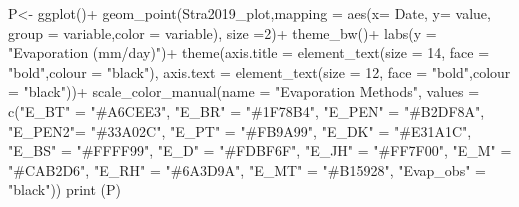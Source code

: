\documentclass[
]{article}
\newenvironment{Shaded}{\begin{snugshade}}{\end{snugshade}}
\newcommand{\AttributeTok}[1]{\textcolor[rgb]{0.77,0.63,0.00}{#1}}
\newcommand{\DecValTok}[1]{\textcolor[rgb]{0.00,0.00,0.81}{#1}}
\newcommand{\FunctionTok}[1]{\textcolor[rgb]{0.00,0.00,0.00}{#1}}
\newcommand{\NormalTok}[1]{#1}
\newcommand{\OtherTok}[1]{\textcolor[rgb]{0.56,0.35,0.01}{#1}}
\newcommand{\SpecialCharTok}[1]{\textcolor[rgb]{0.00,0.00,0.00}{#1}}
\newcommand{\StringTok}[1]{\textcolor[rgb]{0.31,0.60,0.02}{#1}}
\begin{document}
\begin{Shaded}
\begin{Highlighting}[]
\NormalTok{P}\OtherTok{\textless{}{-}} \FunctionTok{ggplot}\NormalTok{()}\SpecialCharTok{+}
  \FunctionTok{geom\_point}\NormalTok{(Stra2019\_plot,}\AttributeTok{mapping =} \FunctionTok{aes}\NormalTok{(}\AttributeTok{x=}\NormalTok{ Date, }\AttributeTok{y=}\NormalTok{ value,  }\AttributeTok{group =}\NormalTok{ variable,}\AttributeTok{color =}\NormalTok{ variable), }\AttributeTok{size =}\DecValTok{2}\NormalTok{)}\SpecialCharTok{+}
  \FunctionTok{theme\_bw}\NormalTok{()}\SpecialCharTok{+}
  \FunctionTok{labs}\NormalTok{(}\AttributeTok{y =} \StringTok{"Evaporation (mm/day)"}\NormalTok{)}\SpecialCharTok{+}
  \FunctionTok{theme}\NormalTok{(}\AttributeTok{axis.title =} \FunctionTok{element\_text}\NormalTok{(}\AttributeTok{size =} \DecValTok{14}\NormalTok{, }\AttributeTok{face =} \StringTok{"bold"}\NormalTok{,}\AttributeTok{colour =} \StringTok{"black"}\NormalTok{),}
        \AttributeTok{axis.text  =} \FunctionTok{element\_text}\NormalTok{(}\AttributeTok{size =} \DecValTok{12}\NormalTok{, }\AttributeTok{face =} \StringTok{"bold"}\NormalTok{,}\AttributeTok{colour =} \StringTok{"black"}\NormalTok{))}\SpecialCharTok{+}
  \FunctionTok{scale\_color\_manual}\NormalTok{(}\AttributeTok{name =} \StringTok{"Evaporation Methods"}\NormalTok{,}
                     \AttributeTok{values =} \FunctionTok{c}\NormalTok{(}\StringTok{"E\_BT"} \OtherTok{=} \StringTok{"\#A6CEE3"}\NormalTok{,}
                                \StringTok{"E\_BR"} \OtherTok{=} \StringTok{"\#1F78B4"}\NormalTok{,}
                                \StringTok{"E\_PEN"} \OtherTok{=} \StringTok{"\#B2DF8A"}\NormalTok{,}
                                \StringTok{"E\_PEN2"}\OtherTok{=} \StringTok{"\#33A02C"}\NormalTok{,}
                                \StringTok{"E\_PT"} \OtherTok{=} \StringTok{"\#FB9A99"}\NormalTok{,}
                                \StringTok{"E\_DK"} \OtherTok{=} \StringTok{"\#E31A1C"}\NormalTok{,}
                                \StringTok{"E\_BS"} \OtherTok{=} \StringTok{"\#FFFF99"}\NormalTok{,}
                                 \StringTok{"E\_D"} \OtherTok{=} \StringTok{"\#FDBF6F"}\NormalTok{,                     }
                                \StringTok{"E\_JH"} \OtherTok{=} \StringTok{"\#FF7F00"}\NormalTok{,  }
                               \StringTok{"E\_M"} \OtherTok{=} \StringTok{"\#CAB2D6"}\NormalTok{,}
                               \StringTok{"E\_RH"} \OtherTok{=} \StringTok{"\#6A3D9A"}\NormalTok{,                     }
                                \StringTok{"E\_MT"} \OtherTok{=} \StringTok{"\#B15928"}\NormalTok{,}
                               \StringTok{"Evap\_obs"} \OtherTok{=} \StringTok{"black"}\NormalTok{))}
\FunctionTok{print}\NormalTok{ (P)}
\end{Highlighting}
\end{Shaded}
\end{document}
